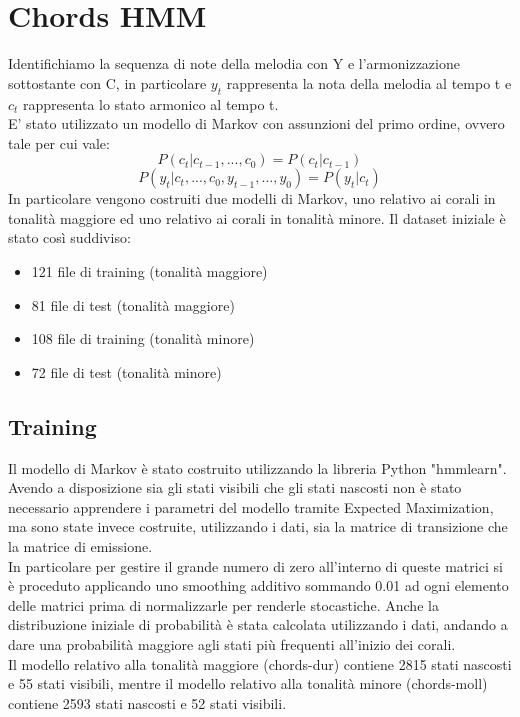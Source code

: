 \chapter{Chords HMM}\label{ch:hmm-chords}
Identifichiamo la sequenza di note della melodia con Y e l'armonizzazione sottostante con C, in particolare $y_t$ rappresenta la nota della melodia al tempo t e $c_t$ rappresenta lo stato armonico al tempo t. \\
E' stato utilizzato un modello di Markov con assunzioni del primo ordine, ovvero tale per cui vale:
\begin{equation}
P(c_t|c_{t-1},...,c_0) = P(c_t|c_{t-1})
\end{equation}
\begin{equation}
P(y_t|c_t,...,c_0,y_{t-1},...,y_0) = P(y_t|c_t)
\end{equation}
In particolare vengono costruiti due modelli di Markov, uno relativo ai corali in tonalità maggiore ed uno relativo ai corali in tonalità minore.
Il dataset iniziale è stato così suddiviso:
\begin{itemize}
\item 121 file di training (tonalità maggiore)
\item 81 file di test (tonalità maggiore)
\item 108 file di training (tonalità minore)
\item 72 file di test (tonalità minore)
\end{itemize}
\section{Training}
Il modello di Markov è stato costruito utilizzando la libreria Python "hmmlearn". \\
Avendo a disposizione sia gli stati visibili che gli stati nascosti non è stato necessario apprendere i parametri del modello tramite Expected Maximization, ma sono state invece costruite, utilizzando i dati, sia la matrice di transizione che la matrice di emissione.\\
In particolare per gestire il grande numero di zero all'interno di queste matrici si è proceduto applicando uno smoothing additivo sommando 0.01 ad ogni elemento delle matrici prima di normalizzarle per renderle stocastiche.
Anche la distribuzione iniziale di probabilità è stata calcolata utilizzando i dati, andando a dare una probabilità maggiore agli stati più frequenti all'inizio dei corali. \\
Il modello relativo alla tonalità maggiore (chords-dur) contiene 2815 stati nascosti e 55 stati visibili, mentre il modello relativo alla tonalità minore (chords-moll) contiene 2593 stati nascosti e 52 stati visibili.
